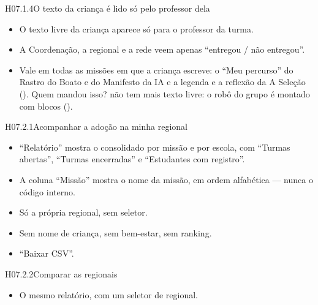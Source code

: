 \begin{historia}{H07.1.4}{O texto da criança é lido só pelo professor dela}{\pronto}
\aceite
\begin{itemize}
  \item O texto livre da criança aparece só para o professor da turma.
  \item A Coordenação, a regional e a rede veem apenas \enquote{entregou / não
    entregou}.
  \item Vale em todas as missões em que a criança escreve: o \enquote{Meu
    percurso} do Rastro do Boato e do Manifesto da IA e a legenda e a reflexão
    da A Seleção (). Quem mandou isso? não tem mais texto livre:
    o robô do grupo é montado com blocos ().
\end{itemize}
\end{historia}


\begin{historia}{H07.2.1}{Acompanhar a adoção na minha regional}{\pronto}
\aceite
\begin{itemize}
  \item \enquote{Relatório} mostra o consolidado por missão e por escola, com
    \enquote{Turmas abertas}, \enquote{Turmas encerradas} e
    \enquote{Estudantes com registro}.
  \item A coluna \enquote{Missão} mostra o nome da missão, em ordem
    alfabética --- nunca o código interno.
  \item Só a própria regional, sem seletor.
  \item Sem nome de criança, sem bem-estar, sem ranking.
  \item \enquote{Baixar CSV}.
\end{itemize}
\end{historia}

\begin{historia}{H07.2.2}{Comparar as regionais}{\pronto}
\aceite
\begin{itemize}
  \item O mesmo relatório, com um seletor de regional.
\end{itemize}
\end{historia}


